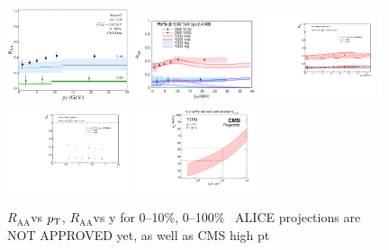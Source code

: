 \documentclass[../report.tex]{subfiles}
\providecommand{\pt}{\ensuremath{p_\text{T}}\Xspace}
\providecommand{\raa}{\ensuremath{R_\text{AA}}\Xspace}
\begin{document}
\begin{figure}
\begin{center}
 \includegraphics[width=0.32\textwidth]{quarkonia/fig/theory/strickland_pt.png}
 \includegraphics[width=0.32\textwidth]{quarkonia/fig/theory/rapp_raa_pt_CMS.png}
 \includegraphics[width=0.32\textwidth]{quarkonia/fig/alice/craa_pt}
 \includegraphics[width=0.32\textwidth]{quarkonia/fig/alice/craa_y}
 \includegraphics[width=0.32\textwidth]{quarkonia/fig/cms/Upsilon1S_pTvsLumi}
\end{center}

 \caption{\raa vs $\pt$, \raa vs y for 0--10\%, 0--100\%~\cite{Krouppa:2017jlg,Du:2017qkv} ALICE projections are NOT APPROVED yet, as well as CMS high pt
 }
 \label{fig:upsi_raa_pt_y}
\end{figure}
\end{document}
